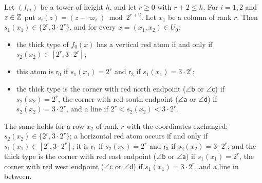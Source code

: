 \begin{lemma}\label{fam:red}
Let $(f_m)$ be a tower of height $h$, and let $r\ge0$ with $r+2\le h$. For $i=1,2$ and $z\in\mathbb{Z}$ put $s_i(z)=(z-\varpi_i)\bmod 2^{r+2}$. Let $x_1$ be a column of rank $r$. Then $s_1(x_1)\in\{2^r,3\cdot2^r\}$, and for every $x=(x_1,x_2)\in U_0$:
\begin{itemize}
\item[(a)] the thick type of $f_0(x)$ has a vertical red atom if and only if $s_2(x_2)\in[2^r,3\cdot2^r]$;
\item[(b)] this atom is $\mathsf r_0$ if $s_1(x_1)=2^r$ and $\mathsf r_2$ if $s_1(x_1)=3\cdot2^r$;
\item[(c)] the thick type is the corner with red north endpoint ($\angle\mathsf b$ or $\angle\mathsf c$) if $s_2(x_2)=2^r$, the corner with red south endpoint ($\angle\mathsf a$ or $\angle\mathsf d$) if $s_2(x_2)=3\cdot2^r$, and a line if $2^r<s_2(x_2)<3\cdot2^r$.
\end{itemize}
The same holds for a row $x_2$ of rank $r$ with the coordinates exchanged: $s_2(x_2)\in\{2^r,3\cdot2^r\}$; a horizontal red atom occurs if and only if $s_1(x_1)\in[2^r,3\cdot2^r]$; it is $\mathsf r_1$ if $s_2(x_2)=2^r$ and $\mathsf r_3$ if $s_2(x_2)=3\cdot2^r$; and the thick type is the corner with red east endpoint ($\angle\mathsf b$ or $\angle\mathsf a$) if $s_1(x_1)=2^r$, the corner with red west endpoint ($\angle\mathsf c$ or $\angle\mathsf d$) if $s_1(x_1)=3\cdot2^r$, and a line in between.
\end{lemma}

